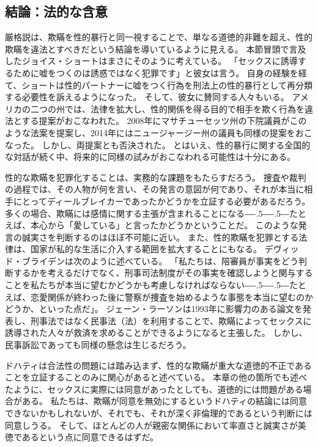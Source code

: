 \documentclass[paper=a4,book,openany]{jlreq}
\def\DDASH{―\kern-.5\zw―\kern-.5\zw―} %
\begin{document}
\subsection{結論：法的な含意}

厳格説は、欺瞞を性的暴行と同一視することで、単なる道徳的非難を超え、性的欺瞞を違法とすべきだという結論を導いているように見える。
本節冒頭で言及したジョイス・ショートはまさにそのように考えている。
「セックスに誘導するために嘘をつくのは誘惑ではなく犯罪です」と彼女は言う\citep{mcarthur16:_is_lying_get_laid_form_sexual_assaul}。
自身の経験を経て、ショートは性的パートナーに嘘をつく行為を刑法上の性的暴行として再分類する必要性を訴えるようになった。
そして、彼女に賛同する人々もいる。
アメリカの二つの州では、法律を拡大し、性的関係を得る目的で相手を欺く行為を違法とする提案がおこなわれた。
2008年にマサチューセッツ州の下院議員がこのような法案を提案し、2014年にはニュージャージー州の議員も同様の提案をおこなった。
しかし、両提案とも否決された。
とはいえ、性的暴行に関する全国的な対話が続く中、将来的に同様の試みがおこなわれる可能性は十分にある。

性的な欺瞞を犯罪化することは、実務的な課題をもたらすだろう。
捜査や裁判の過程では、その人物が何を言い、その発言の意図が何であり、それが本当に相手にとってディールブレイカーであったかどうかを立証する必要があるだろう。
多くの場合、欺瞞には感情に関する主張が含まれることになる{\DDASH}たとえば、本心から「愛している」と言ったかどうかということだ。
このような発言の誠実さを判断するのはほぼ不可能に近い。
また、性的欺瞞を犯罪とする法律は、国家が私的な生活に介入する範囲を拡大することにもなる。
デヴィッド・ブライデンは次のように述べている。
「私たちは、陪審員が事実をどう判断するかを考えるだけでなく、刑事司法制度がその事実を確認しようと関与することを私たちが本当に望むかどうかも考慮しなければならない{\DDASH}たとえば、恋愛関係が終わった後に警察が捜査を始めるような事態を本当に望むのかどうか、といった点だ」\citep[p.469]{bryden00:_redef_rape}。
ジェーン・ラーソンは1993年に影響力のある論文を発表し、刑事法ではなく民事法（法）を利用することで、欺瞞によってセックスに誘導された人々が救済を求めることができるようになると主張した\citep{larson93:_women_under_so_littl_they}。
しかし、民事訴訟であっても同様の懸念は生じるだろう。

ドハティは合法性の問題には踏み込まず、性的な欺瞞が重大な道徳的不正であることを立証することのみに関心があると述べている。
本章の他の箇所でも述べたように、セックスに実際には同意があったとしても、道徳的には問題がある場合がある。
私たちは、欺瞞が同意を無効にするというドハティの結論には同意できないかもしれないが、それでも、それが深く非倫理的であるという判断には同意しうる。
そして、ほとんどの人が親密な関係において率直さと誠実さが美徳であるという点に同意できるはずだ。
\end{document}
